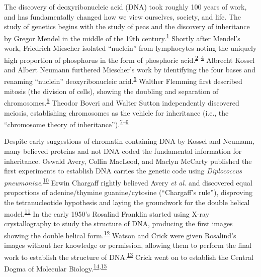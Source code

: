 \documentclass[11pt,letterpaper,oneside]{book}
\begin{document}
The discovery of deoxyribonucleic acid (DNA) took roughly 100 years of work, and has fundamentally changed how we view ourselves, society, and life.
The study of genetics begins with the study of peas and the discovery of inheritance by Gregor Mendel in the middle of the 19th century.\textsuperscript{\protect\hyperlink{ref-mendel:1866aa}{1}}
Shortly after Mendel's work, Friedrich Miescher isolated ``nuclein'' from lymphocytes noting the uniquely high proportion of phosphorus in the form of phosphoric acid.\textsuperscript{\protect\hyperlink{ref-miescher:1871aa}{2}--\protect\hyperlink{ref-miescher:1874ab}{4}}
Albrecht Kossel and Albert Neumann furthered Miescher's work by identifying the four bases and renaming ``nuclein'' deoxyribonucleic acid.\textsuperscript{\protect\hyperlink{ref-kossel:1893aa}{5}}
Walther Flemming first described mitosis (the division of cells), showing the doubling and separation of chromosomes.\textsuperscript{\protect\hyperlink{ref-flemming:1878aa}{6}}
Theodor Boveri and Walter Sutton independently discovered meiosis, establishing chromosomes as the vehicle for inheritance (i.e., the ``chromosome theory of inheritance'').\textsuperscript{\protect\hyperlink{ref-boveri:1902aa}{7}--\protect\hyperlink{ref-sutton:1903aa}{9}}

Despite early suggestions of chromatin containing DNA by Kossel and Neumann, many believed proteins and not DNA coded the fundamental information for inheritance.
Oswald Avery, Collin MacLeod, and Maclyn McCarty published the first experiments to establish DNA carries the genetic code using \emph{Diplococcus pneumoniae}.\textsuperscript{\protect\hyperlink{ref-avery:1944aa}{10}}
Erwin Chargaff rightly believed Avery \emph{et al.} and discovered equal proportions of adenine/thymine guanine/cytosine (``Chargaff's rule''), disproving the tetranucleotide hypothesis and laying the groundwork for the double helical model.\textsuperscript{\protect\hyperlink{ref-chargaff:1949aa}{11}}
In the early 1950's Rosalind Franklin started using X-ray crystallography to study the structure of DNA, producing the first images showing the double helical form.\textsuperscript{\protect\hyperlink{ref-franklin:1953aa}{12}}
Watson and Crick were given Rosalind's images without her knowledge or permission, allowing them to perform the final work to establish the structure of DNA.\textsuperscript{\protect\hyperlink{ref-watson:1953aa}{13}}
Crick went on to establish the Central Dogma of Molecular Biology.\textsuperscript{\protect\hyperlink{ref-crick:1958aa}{14},\protect\hyperlink{ref-crick:1970aa}{15}}
\end{document}
